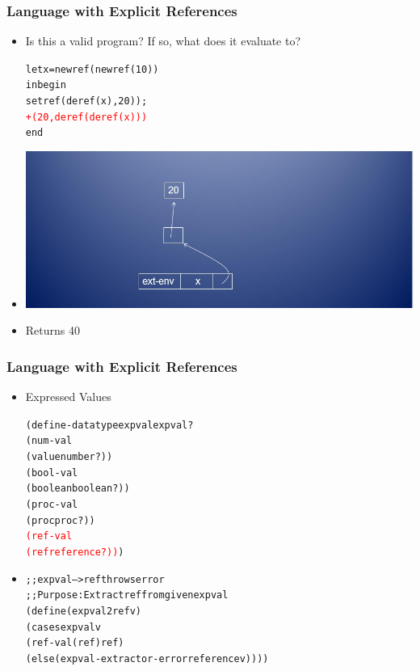 \documentclass{beamer}
\newcommand{\quot}{\texttt{\textquotesingle{}}}
\begin{document}
\begin{frame}[fragile]
\frametitle{Language with Explicit References}
\begin{scriptsize}
\begin{itemize}
\item<1-> Is this a valid program? If so, what does it evaluate to?
\begin{alltt}
let x = newref(newref(10))
in begin
	setref(deref(x), 20));
	\textcolor{red}{+(20, deref(deref(x)))}
   end
\end{alltt}

\item<1->
\begin{center}
\includegraphics[scale=0.5]{pointer-chain5.jpg}
\end{center}

\item<1-> Returns 40
\end{itemize}
\end{scriptsize}
\end{frame}

\begin{frame}[fragile]
\frametitle{Language with Explicit References}
\begin{scriptsize}
\begin{itemize}
\item<1-> Expressed Values
\begin{alltt}
(define-datatype expval expval?
  (num-val
   (value number?))
  (bool-val
   (boolean boolean?))
  (proc-val
   (proc proc?))
  \textcolor{red}{(ref-val
   (ref reference?))})
\end{alltt}

\item<2->
\begin{alltt}
;; expval --> ref throws error
;; Purpose: Extract ref from given expval
(define (expval2ref v)
  (cases expval v
    (ref-val (ref) ref)
    (else (expval-extractor-error \quot{}reference v))))
\end{alltt}

\end{itemize}
\end{scriptsize}
\end{frame}
\end{document}
